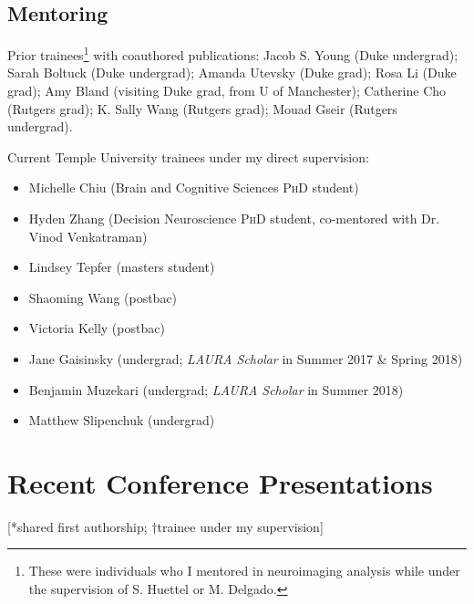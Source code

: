 \documentclass[11pt, letterpaper]{article}
\begin{document}
\subsection*{Mentoring}
\begin{hangparas}{.5in}{1}
Prior trainees\footnote{These were individuals who I mentored in neuroimaging analysis while under the supervision of S. Huettel or M. Delgado.} with coauthored publications: Jacob S. Young (Duke undergrad); Sarah Boltuck (Duke undergrad); Amanda Utevsky (Duke grad); Rosa Li (Duke grad); Amy Bland (visiting Duke grad, from U of Manchester); Catherine Cho (Rutgers grad); K. Sally Wang (Rutgers grad); Mouad Gseir (Rutgers undergrad). \\ [.1cm]
\end{hangparas}

Current Temple University trainees under my direct supervision:
\begin{itemize}[noitemsep]
\item Michelle Chiu (Brain and Cognitive Sciences \textsc{PhD} student)
\item Hyden Zhang (Decision Neuroscience \textsc{PhD} student, co-mentored with Dr. Vinod Venkatraman)
\item Lindsey Tepfer (masters student)
\item Shaoming Wang (postbac)
\item Victoria Kelly (postbac)
\item Jane Gaisinsky (undergrad; \textit{LAURA Scholar} in Summer 2017 \& Spring 2018)
\item Benjamin Muzekari (undergrad; \textit{LAURA Scholar} in Summer 2018)
\item Matthew Slipenchuk (undergrad)
\end{itemize}



\section*{Recent Conference Presentations}
[*shared first authorship; †trainee under my supervision]
\end{document}
